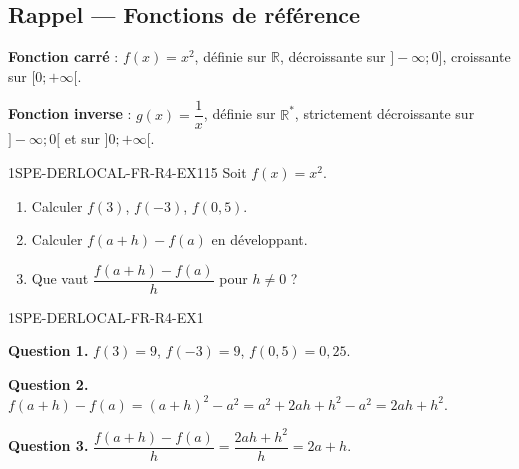 

\subsection*{Rappel — Fonctions de référence}

\textbf{Fonction carré} : $f(x) = x^2$, définie sur $\mathbb{R}$, décroissante sur $]-\infty;0]$, croissante sur $[0;+\infty[$.

\textbf{Fonction inverse} : $g(x) = \dfrac{1}{x}$, définie sur $\mathbb{R}^*$, strictement décroissante sur $]-\infty;0[$ et sur $]0;+\infty[$.


\begin{exercice}{1SPE-DERLOCAL-FR-R4-EX1}{1}{5}
Soit $f(x) = x^2$.
\begin{enumerate}
  \item Calculer $f(3)$, $f(-3)$, $f(0{,}5)$.
  \item Calculer $f(a+h) - f(a)$ en développant.
  \item Que vaut $\dfrac{f(a+h)-f(a)}{h}$ pour $h
\neq 0$ ?
\end{enumerate}
\end{exercice}


\begin{corrige}{1SPE-DERLOCAL-FR-R4-EX1}

\textbf{Question 1.}
$f(3) = 9$, \quad $f(-3) = 9$, \quad $f(0{,}5) = 0{,}25$.


\textbf{Question 2.}
$f(a+h) - f(a) = (a+h)^2 - a^2 = a^2 + 2ah + h^2 - a^2 = 2ah + h^2.$

\textbf{Question 3.}
$\dfrac{f(a+h)-f(a)}{h} = \dfrac{2ah + h^2}{h} = 2a + h.$

\end{corrige}

